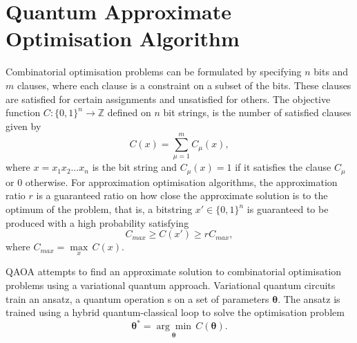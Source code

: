 
\section{Quantum Approximate Optimisation Algorithm} \label{sec:qaoa}
    Combinatorial optimisation problems can be formulated by specifying $n$ bits and $m$ clauses, where each clause is a constraint on a subset of the bits. These clauses are satisfied for certain assignments and unsatisfied for others. The objective function $C:\{0,1\}^n\to\mathbb{Z}$ defined on $n$ bit strings, is the number of satisfied clauses given by 
    \begin{equation}
        C(x) = \sum^m_{\mu=1}C_\mu(x),
    \end{equation}
    where $x=x_1x_2\dots x_n$ is the bit string and $C_\mu(x)=1 $ if it satisfies the clause $C_\mu$ or 0 otherwise. For approximation optimisation algorithms, the approximation ratio $r$ is a guaranteed ratio on how close the approximate solution is to the optimum of the problem, that is, a bitstring $x'\in\{0,1\}^n$ is guaranteed to be produced with a high probability satisfying
    \begin{equation}
        C_{max}\geq C(x')\geq rC_{max},
    \end{equation}
    where $C_{max} = \underset{x}{\max}\,C(x)$.

    QAOA attempts to find an approximate solution to combinatorial optimisation problems using a variational quantum approach. Variational quantum circuits train an ansatz, a quantum operation s on a set of parameters $\pmb{\theta}$. The ansatz is trained using a hybrid quantum-classical loop to solve the optimisation problem
    \begin{equation}
        \pmb{\theta^*} = \underset{\pmb{\theta}}{\arg\min} \, C(\pmb{\theta}).
    \end{equation}

    
